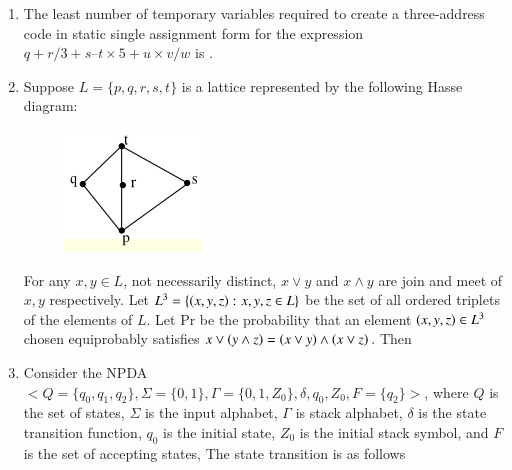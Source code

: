 \documentclass[journal,12pt,onecolumn]{IEEEtran}
\theoremstyle{remark}
\begin{document}
\begin{enumerate}[resume]
		\hfill{}
		
		\item The least number of temporary variables required to create a three-address code in static single assignment form for the expression $q + r/3 + s – t \times 5 + u \times v/w$ is \underline{\hspace{2cm}}.
		
		\hfill{}
		
		\item Suppose $L = \{p, q, r, s, t\}$ is a lattice represented by the following Hasse diagram:
		
		\begin{figure}[H]
			\centering
			\includegraphics[width=0.3\linewidth]{figs/screenshot003}
			\caption{}
			\label{fig:screenshot003}
		\end{figure}
		
		
		For any $x,y \in L$, not necessarily distinct, $x \lor y$ and $x \land y$ are join and meet of $x, y$ respectively. Let $L^3 = \{\left(x,y,z\right)\colon x, y, z \in L\}$ be the set of all ordered triplets of the elements of $L$. Let Pr be the probability that an element $\left(x,y,z\right) \in L^3$ chosen equiprobably satisfies $x \lor \left(y \land z\right) = \left(x \lor y\right) \land \left(x \lor z\right)$. Then
		
		\hfill{}
		
		\begin{enumerate}
		\end{enumerate}
		
		\item Consider the NPDA $<Q = \{q_0, q_1, q_2\}, \Sigma = \{0, 1\}, \Gamma = \{0, 1, Z_0\}, \delta, q_0, Z_0, F = \{q_2\}>$, where  $Q$ is the set of states, $\Sigma$ is the input alphabet, $\Gamma$ is stack alphabet, $\delta$ is the state transition function, $q_0$ is the initial state, $Z_0$ is the initial stack symbol, and $F$ is the set of accepting states, The state transition is as follows
		

\end{enumerate}
\end{document}
